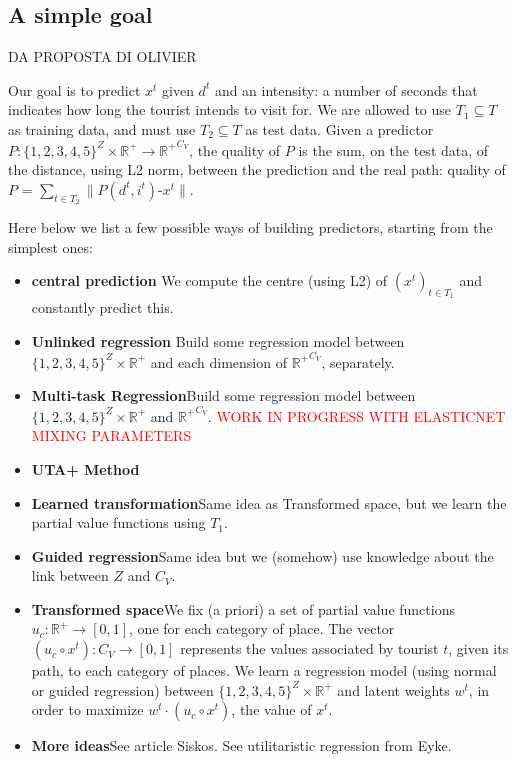 \documentclass[a4paper]{article}
\begin{document}
\subsection{A simple goal}
 DA PROPOSTA DI OLIVIER


Our goal is to predict $x^t$ given $d^t$ and an intensity: a number of seconds that indicates how long the tourist intends to visit for. We are allowed to use $T_1 \subseteq T$ as training data, and must use $T_2 \subseteq T$ as test data. Given a predictor $P: \{1, 2, 3, 4, 5\}^Z \times {\mathbb{R}^+} \rightarrow {\mathbb{R}^+}^{C_V}$, the quality of $P$ is the sum, on the test data, of the distance, using L2 norm, between the prediction and the real path: quality of $P$ = $\sum_{t \in T_2} \|P(d^t, i^t) $-$ x^t\|$.

Here below we list a few possible ways of building predictors, starting from the simplest ones:

\begin{itemize}
    \item \textbf{central prediction} We compute the centre (using L2) of $(x^t)_{t \in T_1}$ and constantly predict this.
    \item\textbf{Unlinked regression} Build some regression model between ${\{1, 2, 3, 4, 5\}}^Z \times {\mathbb{R}^+}$ and each dimension of ${\mathbb{R}^+}^{C_V}$, separately.
    \item \textbf{Multi-task Regression}Build some regression model between ${\{1, 2, 3, 4, 5\}}^Z \times {\mathbb{R}^+}$ and ${\mathbb{R}^+}^{C_V}$.
 \textcolor{red}{WORK IN PROGRESS WITH ELASTICNET MIXING PARAMETERS}
    \item \textbf{UTA+ Method}
    \item \textbf{Learned transformation}Same idea as Transformed space, but we learn the partial value functions using $T_1$.
    \item \textbf{Guided regression}Same idea but we (somehow) use knowledge about the link between $Z$ and $C_V$.
    \item \textbf{Transformed space}We fix (a priori) a set of partial value functions $u_c: {\mathbb{R}^+} \rightarrow [0, 1]$, one for each category of place. The vector $(u_c \circ x^t): C_V \rightarrow [0, 1]$ represents the values associated by tourist $t$, given its path, to each category of places. We learn a regression model (using normal or guided regression) between ${\{1, 2, 3, 4, 5\}}^Z \times {\mathbb{R}^+}$ and latent weights $w^t$, in order to maximize $w^t \cdot (u_c \circ x^t)$, the value of $x^t$.
     \item \textbf{More ideas}See article Siskos. See utilitaristic regression from Eyke.
\end{itemize}
\end{document}
